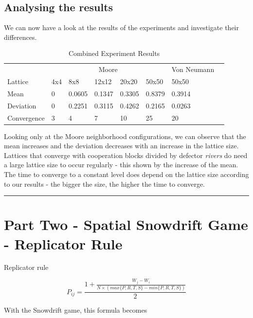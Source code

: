 \documentclass[a4paper, 11pt]{article}
\begin{document}
\newpage
\subsection{Analysing the results}

We can now have a look at the results of the experiments and investigate their differences.

\begin{table}[H]
\centering
\caption{Combined Experiment Results}
\begin{tabular}{l|l|l|l|l|l|l|l}
            & \multicolumn{5}{c|}{Moore}              & Von Neumann &  \\ \cline{1-7}
Lattice     & 4x4 & 8x8    & 12x12  & 20x20  & 50x50  & 50x50       &  \\ \cline{1-7}
Mean        & 0   & 0.0605 & 0.1347 & 0.3305 & 0.8379 & 0.3914      &  \\ \cline{1-7}
Deviation   & 0   & 0.2251 & 0.3115 & 0.4262 & 0.2165 & 0.0263      &  \\ \cline{1-7}
Convergence & 3   & 4      & 7      & 10     & 25     & 20          &  \\ \cline{1-7}
\end{tabular}
\end{table}

Looking only at the Moore neighborhood configurations, we can observe that the mean increases and the deviation decreases with an increase in the lattice size. Lattices that converge with cooperation blocks divided by defector \textit{rivers} do need a large lattice size to occur regularly - this shown by the increase of the mean. The time to converge to a constant level does depend on the lattice size according to our results - the bigger the size, the higher the time to converge.





\hrule

\section{Part Two - Spatial Snowdrift Game - Replicator Rule}

Replicator rule

\[ P_{ij} = \frac{1+ \frac{W_j-W_i}{N \times (max\{P,R,T,S\} - min\{P,R,T,S\})}}{2} \]

With the Snowdrift game, this formula becomes
\end{document}
